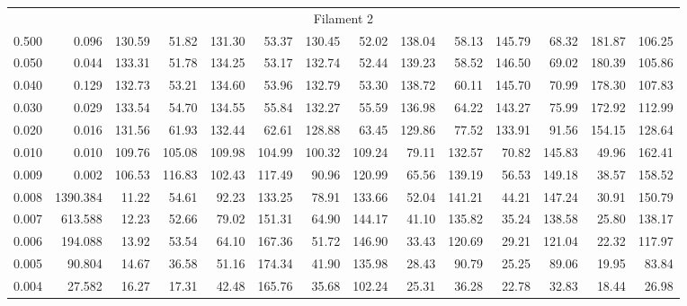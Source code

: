 \begin{tabular}{@{}lrrrrrrrrrrrrr@{}}
\midrule
\multicolumn{14}{c}{Filament 2} \\
\cmidrule{1-14}
0.500 & 0.096 & 130.59 & 51.82 & 131.30 & 53.37 & 130.45 & 52.02 & 138.04 & 58.13 & 145.79 & 68.32 & 181.87 & 106.25 \\
0.050 & 0.044 & 133.31 & 51.78 & 134.25 & 53.17 & 132.74 & 52.44 & 139.23 & 58.52 & 146.50 & 69.02 & 180.39 & 105.86 \\
0.040 & 0.129 & 132.73 & 53.21 & 134.60 & 53.96 & 132.79 & 53.30 & 138.72 & 60.11 & 145.70 & 70.99 & 178.30 & 107.83 \\
0.030 & 0.029 & 133.54 & 54.70 & 134.55 & 55.84 & 132.27 & 55.59 & 136.98 & 64.22 & 143.27 & 75.99 & 172.92 & 112.99 \\
0.020 & 0.016 & 131.56 & 61.93 & 132.44 & 62.61 & 128.88 & 63.45 & 129.86 & 77.52 & 133.91 & 91.56 & 154.15 & 128.64 \\
0.010 & 0.010 & 109.76 & 105.08 & 109.98 & 104.99 & 100.32 & 109.24 & 79.11 & 132.57 & 70.82 & 145.83 & 49.96 & 162.41 \\
0.009 & 0.002 & 106.53 & 116.83 & 102.43 & 117.49 & 90.96 & 120.99 & 65.56 & 139.19 & 56.53 & 149.18 & 38.57 & 158.52 \\
0.008 & 1390.384 & 11.22 & 54.61 & 92.23 & 133.25 & 78.91 & 133.66 & 52.04 & 141.21 & 44.21 & 147.24 & 30.91 & 150.79 \\
0.007 & 613.588 & 12.23 & 52.66 & 79.02 & 151.31 & 64.90 & 144.17 & 41.10 & 135.82 & 35.24 & 138.58 & 25.80 & 138.17 \\
0.006 & 194.088 & 13.92 & 53.54 & 64.10 & 167.36 & 51.72 & 146.90 & 33.43 & 120.69 & 29.21 & 121.04 & 22.32 & 117.97 \\
0.005 & 90.804 & 14.67 & 36.58 & 51.16 & 174.34 & 41.90 & 135.98 & 28.43 & 90.79 & 25.25 & 89.06 & 19.95 & 83.84 \\
0.004 & 27.582 & 16.27 & 17.31 & 42.48 & 165.76 & 35.68 & 102.24 & 25.31 & 36.28 & 22.78 & 32.83 & 18.44 & 26.98 \\


\end{tabular}
